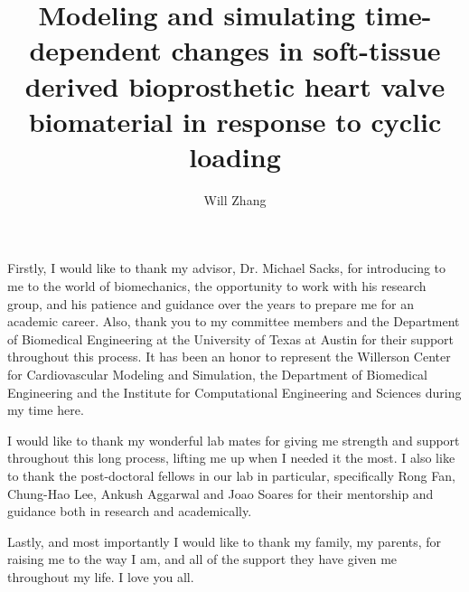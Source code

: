 \documentclass[12pt]{report}
\author{Will Zhang}  	%
\title{Modeling and simulating time-dependent changes in soft-tissue derived bioprosthetic heart valve biomaterial in response to cyclic loading}
\begin{document}
\copyrightpage          %

%
%
\commcertpage           %

\titlepage              %

%

\begin{acknowledgments}		%
%
    Firstly, I would like to thank my advisor, Dr. Michael Sacks, for introducing to me to the world of biomechanics, the opportunity to work with his research group, and his patience and guidance over the years to prepare me for an academic career. Also, thank you to my committee members and the Department of Biomedical Engineering at the University of Texas at Austin for their support throughout this process. It has been an honor to represent the Willerson Center for Cardiovascular Modeling and Simulation, the Department of Biomedical Engineering and the Institute for Computational Engineering and Sciences during my time here.
    

    I would like to thank my wonderful lab mates for giving me strength and support throughout this long process, lifting me up when I needed it the most. I also like to thank the post-doctoral fellows in our lab in particular, specifically Rong Fan, Chung-Hao Lee, Ankush Aggarwal and Joao Soares for their mentorship and guidance both in research and academically.
    

    Lastly, and most importantly I would like to thank my family, my parents, for raising me to the way I am, and all of the support they have given me throughout my life. I love you all.
\end{acknowledgments}
\end{document}
